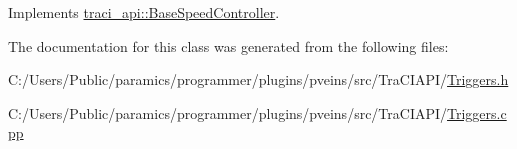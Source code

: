 Implements \hyperlink{classtraci__api_1_1_base_speed_controller_a2d4b22945d4cb27f5fe24b05700021b6}{traci\+\_\+api\+::\+Base\+Speed\+Controller}.



The documentation for this class was generated from the following files\+:\begin{DoxyCompactItemize}
\item 
C\+:/\+Users/\+Public/paramics/programmer/plugins/pveins/src/\+Tra\+C\+I\+A\+P\+I/\hyperlink{_triggers_8h}{Triggers.\+h}\item 
C\+:/\+Users/\+Public/paramics/programmer/plugins/pveins/src/\+Tra\+C\+I\+A\+P\+I/\hyperlink{_triggers_8cpp}{Triggers.\+cpp}\end{DoxyCompactItemize}

